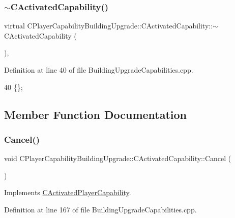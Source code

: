 \subsubsection{\texorpdfstring{$\sim$\+C\+Activated\+Capability()}{~CActivatedCapability()}}
{\footnotesize\ttfamily virtual C\+Player\+Capability\+Building\+Upgrade\+::\+C\+Activated\+Capability\+::$\sim$\+C\+Activated\+Capability (\begin{DoxyParamCaption}{ }\end{DoxyParamCaption})\hspace{0.3cm}{\ttfamily [inline]}, {\ttfamily [virtual]}}



Definition at line 40 of file Building\+Upgrade\+Capabilities.\+cpp.


\begin{DoxyCode}
40 \{\};
\end{DoxyCode}


\subsection{Member Function Documentation}
\hypertarget{classCPlayerCapabilityBuildingUpgrade_1_1CActivatedCapability_adca97e7f7611f4adfcfea615428dac0b}{}\label{classCPlayerCapabilityBuildingUpgrade_1_1CActivatedCapability_adca97e7f7611f4adfcfea615428dac0b} 
\subsubsection{\texorpdfstring{Cancel()}{Cancel()}}
{\footnotesize\ttfamily void C\+Player\+Capability\+Building\+Upgrade\+::\+C\+Activated\+Capability\+::\+Cancel (\begin{DoxyParamCaption}{ }\end{DoxyParamCaption})\hspace{0.3cm}{\ttfamily [virtual]}}



Implements \hyperlink{classCActivatedPlayerCapability_a5cde83be468e262ad054d81e28684a81}{C\+Activated\+Player\+Capability}.



Definition at line 167 of file Building\+Upgrade\+Capabilities.\+cpp.


